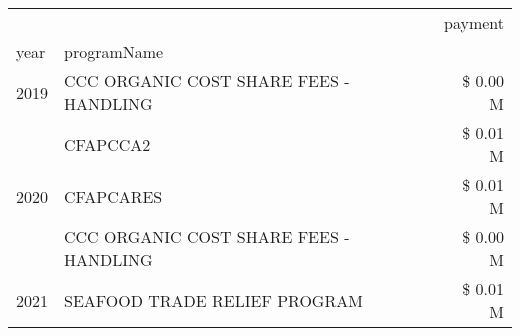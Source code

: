 \begin{tabular}{llr}
\toprule
 &  & payment \\
year & programName &  \\
\midrule
2019 & CCC ORGANIC COST SHARE FEES - HANDLING & \$ 0.00 M \\
\cline{1-3}
\multirow[t]{3}{*}{2020} & CFAPCCA2 & \$ 0.01 M \\
 & CFAPCARES & \$ 0.01 M \\
 & CCC ORGANIC COST SHARE FEES - HANDLING & \$ 0.00 M \\
\cline{1-3}
2021 & SEAFOOD TRADE RELIEF PROGRAM & \$ 0.01 M \\
\cline{1-3}
\bottomrule
\end{tabular}
